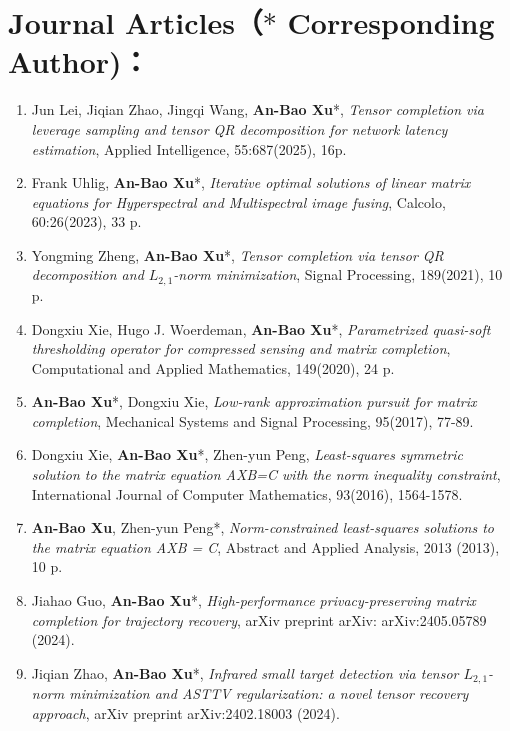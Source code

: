 \documentclass[12pt,a4paper,utf8]{moderncv}
\begin{document}
\section{Journal Articles（$\ast$ Corresponding Author)：}
\begin{enumerate}

\item  Jun Lei, Jiqian Zhao, Jingqi Wang, \textbf{An-Bao Xu}*, \emph{Tensor completion via leverage sampling and tensor QR decomposition for network latency estimation}, Applied Intelligence, 55:687(2025), 16p.

\item Frank Uhlig, \textbf{An-Bao Xu}*,  \emph{Iterative optimal solutions of linear matrix equations for Hyperspectral and Multispectral image fusing}, Calcolo, 60:26(2023), 33 p.

\item Yongming Zheng, \textbf{An-Bao Xu}*,  \emph{Tensor completion via tensor QR decomposition and $L_{2,1}$-norm minimization}, Signal Processing, 189(2021), 10 p. 
\item Dongxiu Xie, Hugo J. Woerdeman, \textbf{An-Bao Xu}*,  \emph{Parametrized quasi-soft thresholding operator for compressed sensing and matrix completion}, Computational and Applied Mathematics, 149(2020), 24 p.
\item \textbf{An-Bao Xu}*, Dongxiu Xie,  \emph{Low-rank approximation pursuit for matrix completion}, Mechanical Systems and Signal Processing, 95(2017), 77-89. %
\item Dongxiu Xie, \textbf{An-Bao Xu}*, Zhen-yun Peng,  \emph{Least-squares symmetric solution to the matrix equation AXB=C with the norm inequality constraint}, International Journal of Computer Mathematics, 93(2016), 1564-1578.%
\item \textbf{An-Bao Xu}, Zhen-yun Peng*,  \emph{Norm-constrained least-squares solutions to the matrix equation AXB = C}, Abstract and Applied Analysis, 2013 (2013), 10 p.

\item Jiahao Guo, \textbf{An-Bao Xu}*,  \emph{High-performance privacy-preserving matrix completion for trajectory recovery}, arXiv preprint arXiv: 	arXiv:2405.05789 (2024).

\item Jiqian Zhao, \textbf{An-Bao Xu}*,  \emph{Infrared small target detection via tensor $L_{2,1}$-norm minimization and ASTTV regularization: a novel tensor recovery approach}, arXiv preprint arXiv:2402.18003 (2024).




\end{enumerate}
\end{document}

